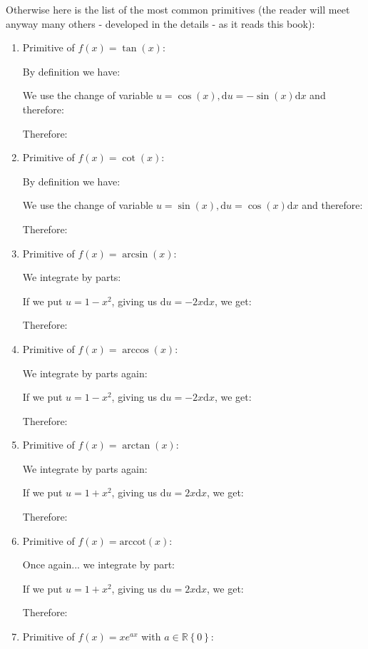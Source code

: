 	Otherwise here is the list of the most common primitives (the reader will meet anyway many others - developed in the details - as it reads this book):
	\begin{enumerate}
		\item Primitive of $f(x)=\tan (x)$:
		
		By definition we have:
		
		We use the change of variable $u=\cos(x),\mathrm{d}u=-\sin(x)\mathrm{d}x$ and therefore:
		
		Therefore:
		
		\item Primitive of $f(x)=\cot(x)$:
		
		By definition we have:
		
		We use the change of variable $u=\sin(x),\mathrm{d}u=\cos(x)\mathrm{d}x$ and therefore:
		 
		Therefore:
		
		\item Primitive of $f(x)=\arcsin(x)$:
		
		We integrate by parts:
		
		If we put $u=1-x^2$, giving us $\mathrm{d}u=-2x\mathrm{d}x$, we get:
		
		Therefore:
		
		\item Primitive of $f(x)=\arccos(x)$:
		
		We integrate by parts again:
		
		If we put $u=1-x^2$, giving us $\mathrm{d}u=-2x\mathrm{d}x$, we get:
		
		Therefore:
		
		\item Primitive of $f(x)=\arctan(x)$:
		
		We integrate by parts again:
		
		If we put $u=1+x^2$, giving us $\mathrm{d}u=2x\mathrm{d}x$, we get:
		
		Therefore:
		
		\item Primitive of $f(x)=\text{arccot}(x)$:
		
		Once again... we integrate by part:
		
		If we put $u=1+x^2$, giving us $\mathrm{d}u=2x\mathrm{d}x$, we get:
		
		Therefore:
		
		\item Primitive of $f(x)=xe^{ax}$ with $a\in \mathbb{R}\left\lbrace 0 \right\rbrace$:
		

\end{enumerate}
